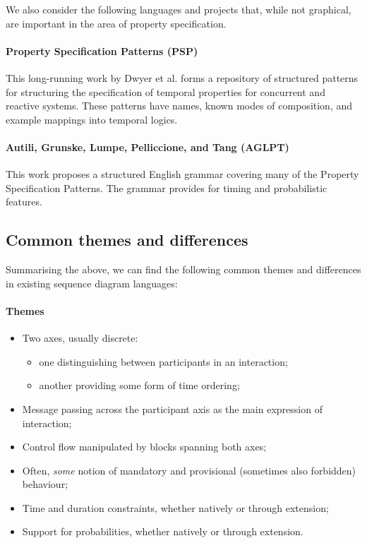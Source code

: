 We also consider the following languages and projects that, while not
graphical, are important in the area of property specification.

\paragraph{Property Specification Patterns (PSP)}

This long-running work by Dwyer et al. forms a repository of
structured patterns for structuring the specification of temporal
properties for concurrent and reactive systems.  These patterns have names,
known modes of composition, and example mappings into temporal logics.

\paragraph{Autili, Grunske, Lumpe, Pelliccione, and Tang (AGLPT)}

This work proposes a structured English grammar covering many of the Property
Specification Patterns.  The grammar provides for timing and probabilistic
features.

\subsection{Common themes and differences}

Summarising the above, we can find the following common
themes and differences in existing sequence
diagram languages:

\paragraph{Themes}

\begin{itemize}
\item
  Two axes, usually discrete:
  \begin{itemize}
  \item
    one distinguishing between participants in an interaction;
  \item
    another providing some form of time ordering;
  \end{itemize}
\item
  Message passing across the participant axis as the main expression of
  interaction;
\item
  Control flow manipulated by blocks 
  spanning both axes;
\item
  Often, \emph{some} notion of mandatory and provisional
  (sometimes also forbidden) behaviour;
\item
  Time and duration constraints, whether natively or through extension;
\item
  Support for probabilities, whether natively or through extension.
\end{itemize}

